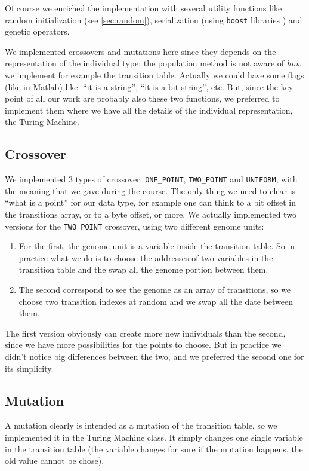 \documentclass{report}
\begin{document}
Of course we enriched the implementation with several utility functions like random initialization (see \ref{sec:random}), serialization (using \texttt{boost} libraries \cite{boost-serialization}) and genetic operators.

We implemented crossovers and mutations here since they depends on the representation of the individual type: the population method is not aware of \textit{how} we implement for example the transition table. Actually we could have some flags (like in Matlab) like: ``it is a string'', ``it is a bit string'', etc. But, since the key point of all our work are probably also these two functions, we preferred to implement them where we have all the details of the individual representation, the Turing Machine.

\subsection{Crossover}
\label{sec:crossover}
We implemented 3 types of crossover: \texttt{ONE\_POINT}, \texttt{TWO\_POINT} and \texttt{UNIFORM}, with the meaning that we gave during the course. The only thing we need to clear is ``what is a point'' for our data type, for example one can think to a bit offset in the transitions array, or to a byte offset, or more.
We actually implemented two versions for the \texttt{TWO\_POINT} crossover, using two different genome units:

\begin{enumerate}
\item For the first, the genome unit is a variable inside the transition table. So in practice what we do is to choose the addresses of two variables in the transition table and the swap all the genome portion between them.
\item The second correspond to see the genome as an array of transitions, so we choose two transition indexes at random and we swap all the date between them.
\end{enumerate}

The first version obviously can create more new individuals than the second, since we have more possibilities for the points to choose. But in practice we didn't notice big differences between the two, and we preferred the second one for its simplicity.

\subsection{Mutation}
\label{sec:mutation}
A mutation clearly is intended as a mutation of the transition table, so we implemented it in the Turing Machine class. It simply changes one single variable in the transition table (the variable changes for sure if the mutation happens, the old value cannot be chose).
\end{document}
